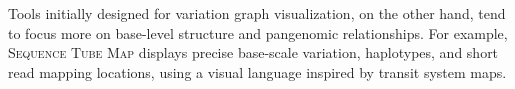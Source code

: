 Tools initially designed for variation graph visualization, on the other hand, tend to focus more on base-level structure and pangenomic relationships.
For example, \textsc{Sequence Tube Map} \cite{Beyer_2019} displays precise base-scale variation, haplotypes, and short read mapping locations, using a visual language inspired by transit system maps.



